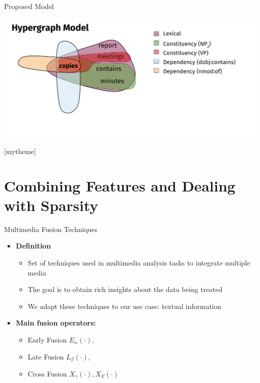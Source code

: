 \documentclass[10pt,xcolor=table]{beamer}
\begin{document}
\begin{frame}{Proposed Model}
\begin{overprint}
	\includegraphics[width=1\linewidth]{image2/Chapitre2/hyper_network_ex_5.pdf}%
	\end{overprint}
	\vspace{7cm}
\end{frame}


[mytheme]
\section[Contributions in Detail]{Combining Features and Dealing with Sparsity}                  

      
\begin{frame}{Multimedia Fusion Techniques}

\begin{itemize}[<+- | alert@+>]
\item \large \textbf{Definition}
	\begin{itemize}
	\item Set of techniques used in multimedia analysis tasks to integrate multiple media \cite{AtreyHEK10,ahn2010link}
	\item The goal is to obtain rich insights about the data being treated
	\item We adapt these techniques to our use case: textual information
	\end{itemize}
\item \large\textbf{Main fusion operators:}
	\begin{itemize}
	\item Early Fusion $E_\alpha(\cdot)$, 
	\item Late Fusion $L_\beta(\cdot)$, 
	\item Cross Fusion $X_\gamma(\cdot), X_F(\cdot)$
	\end{itemize}

\end{itemize}
\end{frame}
\end{document}
